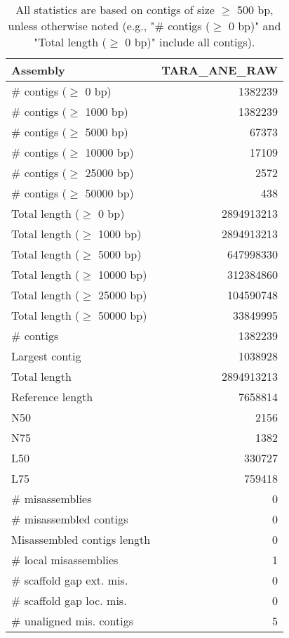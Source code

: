 \documentclass[12pt,a4paper]{article}
\begin{document}
\begin{table}[ht]
\begin{center}
\caption{All statistics are based on contigs of size $\geq$ 500 bp, unless otherwise noted (e.g., "\# contigs ($\geq$ 0 bp)" and "Total length ($\geq$ 0 bp)" include all contigs).}
\begin{tabular}{|l*{1}{|r}|}
\hline
Assembly & TARA\_ANE\_RAW \\ \hline
\# contigs ($\geq$ 0 bp) & 1382239 \\ \hline
\# contigs ($\geq$ 1000 bp) & 1382239 \\ \hline
\# contigs ($\geq$ 5000 bp) & 67373 \\ \hline
\# contigs ($\geq$ 10000 bp) & 17109 \\ \hline
\# contigs ($\geq$ 25000 bp) & 2572 \\ \hline
\# contigs ($\geq$ 50000 bp) & 438 \\ \hline
Total length ($\geq$ 0 bp) & 2894913213 \\ \hline
Total length ($\geq$ 1000 bp) & 2894913213 \\ \hline
Total length ($\geq$ 5000 bp) & 647998330 \\ \hline
Total length ($\geq$ 10000 bp) & 312384860 \\ \hline
Total length ($\geq$ 25000 bp) & 104590748 \\ \hline
Total length ($\geq$ 50000 bp) & 33849995 \\ \hline
\# contigs & 1382239 \\ \hline
Largest contig & 1038928 \\ \hline
Total length & 2894913213 \\ \hline
Reference length & 7658814 \\ \hline
N50 & 2156 \\ \hline
N75 & 1382 \\ \hline
L50 & 330727 \\ \hline
L75 & 759418 \\ \hline
\# misassemblies & 0 \\ \hline
\# misassembled contigs & 0 \\ \hline
Misassembled contigs length & 0 \\ \hline
\# local misassemblies & 1 \\ \hline
\# scaffold gap ext. mis. & 0 \\ \hline
\# scaffold gap loc. mis. & 0 \\ \hline
\# unaligned mis. contigs & 5 \\ \hline

\end{tabular}
\end{center}
\end{table}
\end{document}
